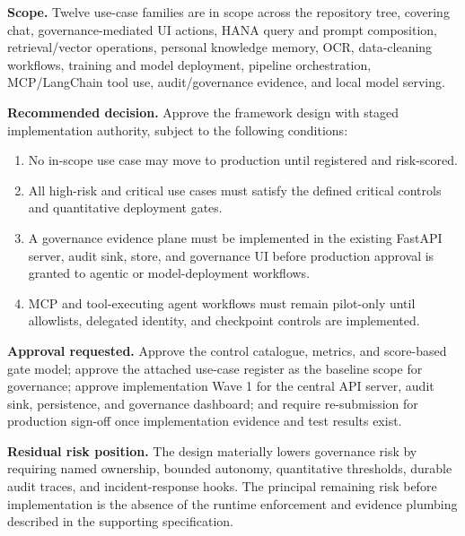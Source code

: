 \documentclass[11pt,a4paper]{article}
\begin{document}
\vspace{0.06cm}
\textbf{Scope.}
Twelve use-case families are in scope across the repository  tree, covering chat, governance-mediated UI actions, HANA query and prompt composition, retrieval/vector operations, personal knowledge memory, OCR, data-cleaning workflows, training and model deployment, pipeline orchestration, MCP/LangChain tool use, audit/governance evidence, and local model serving.

\vspace{0.06cm}
\textbf{Recommended decision.}
Approve the framework design with staged implementation authority, subject to the following conditions:
\begin{enumerate}[nosep,leftmargin=0.6cm]
    \item No in-scope use case may move to production until registered and risk-scored.
    \item All high-risk and critical use cases must satisfy the defined critical controls and quantitative deployment gates.
    \item A governance evidence plane must be implemented in the existing FastAPI server, audit sink, store, and governance UI before production approval is granted to agentic or model-deployment workflows.
    \item MCP and tool-executing agent workflows must remain pilot-only until allowlists, delegated identity, and checkpoint controls are implemented.
\end{enumerate}

\vspace{0.06cm}
\textbf{Approval requested.}
Approve the control catalogue, metrics, and score-based gate model; approve the attached use-case register as the baseline scope for governance; approve implementation Wave 1 for the central API server, audit sink, persistence, and governance dashboard; and require re-submission for production sign-off once implementation evidence and test results exist.

\vspace{0.06cm}
\textbf{Residual risk position.}
The design materially lowers governance risk by requiring named ownership, bounded autonomy, quantitative thresholds, durable audit traces, and incident-response hooks. The principal remaining risk before implementation is the absence of the runtime enforcement and evidence plumbing described in the supporting specification.
\normalsize

\newpage
\tableofcontents
\newpage
\end{document}
